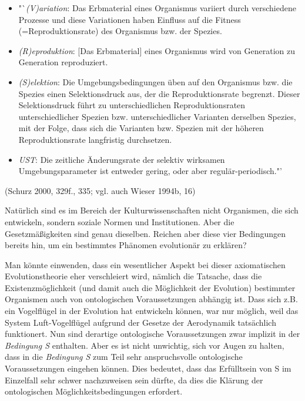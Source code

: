 \documentclass[12pt,a4paper,ngerman]{article}
\begin{document}
\begin{itemize}
  
\item "`{\em (V)ariation}: Das Erbmaterial eines Organismus variiert durch
  verschiedene Prozesse und diese Variationen haben Einfluss auf die Fitness
  (=Reproduktionsrate) des Organismus bzw. der Spezies.
  
\item {\em (R)eproduktion}: [Das Erbmaterial] eines Organismus wird von
  Generation zu Generation reproduziert.

\item {\em (S)elektion}: Die Umgebungsbedingungen üben auf den
Organismus bzw. die Spezies einen Selektionsdruck aus, der die
Reproduktionsrate begrenzt. Dieser Selektionsdruck führt zu
unterschiedlichen Reproduktionsraten unterschiedlicher Spezien
bzw. unterschiedlicher Varianten derselben Spezies, mit der Folge,
dass sich die Varianten bzw. Spezien mit der höheren Reproduktionsrate
langfristig durchsetzen.

\item {\em UST}: Die zeitliche Änderungsrate der selektiv wirksamen
Umgebungsparameter ist entweder gering, oder aber
regulär-periodisch."'

\end{itemize} 

(Schurz 2000, 329f., 335; vgl. auch Wieser 1994b, 16)\vspace{12pt}

Natürlich sind es im Bereich der Kulturwissenschaften nicht
Organismen, die sich entwickeln, sondern soziale Normen und
Institutionen. Aber die Gesetzmäßigkeiten sind genau dieselben.
Reichen aber diese vier Bedingungen bereits hin, um ein bestimmtes
Phänomen evolutionär zu erklären?

Man könnte einwenden, dass ein wesentlicher Aspekt bei
dieser axiomatischen Evolutionstheorie eher verschleiert wird, nämlich
die Tatsache, dass die Existenzmöglichkeit (und damit auch die
Möglichkeit der Evolution) bestimmter Organismen auch von
ontologischen Voraussetzungen abhängig ist. Dass sich
z.B. ein Vogelflügel in der Evolution hat entwickeln können, war nur
möglich, weil das System Luft-Vogelflügel aufgrund der Gesetze der
Aerodynamik tatsächlich funktionert. Nun sind derartige ontologische
Voraussetzungen zwar implizit in der {\em Bedingung S} enthalten. Aber
es ist nicht unwichtig, sich vor Augen zu halten, dass in die
{\em Bedingung S} zum Teil sehr anspruchsvolle ontologische
Voraussetzungen eingehen können. Dies bedeutet, dass das Erfülltsein von S
im Einzelfall sehr schwer nachzuweisen sein dürfte, da dies die Klärung
der ontologischen Möglichkeitsbedingungen erfordert. 
\end{document}
